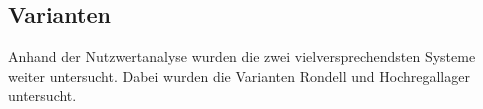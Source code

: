 \subsection{Varianten}

Anhand der Nutzwertanalyse wurden die zwei vielversprechendsten Systeme weiter untersucht. Dabei wurden die Varianten Rondell und Hochregallager untersucht.



